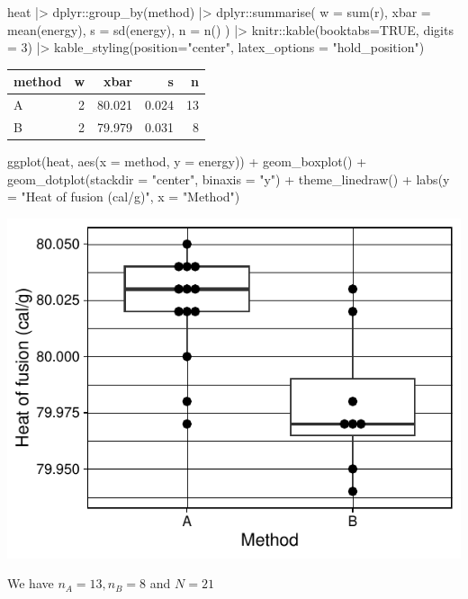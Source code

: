 \documentclass[a4paper]{article}
\begin{document}
\begin{Schunk}
\begin{Sinput}
heat |>
dplyr::group_by(method) |> 
dplyr::summarise(
  w = sum(r),
  xbar = mean(energy),
  s = sd(energy),
  n = n()
) |> 
knitr::kable(booktabs=TRUE, digits = 3) |>
 kable_styling(position="center", latex_options = "hold_position")
\end{Sinput}
\begin{table}[!h]
\centering
\begin{tabular}{lrrrr}
\toprule
method & w & xbar & s & n\\
\midrule
A & 2 & 80.021 & 0.024 & 13\\
B & 2 & 79.979 & 0.031 & 8\\
\bottomrule
\end{tabular}
\end{table}

\begin{Sinput}
ggplot(heat, aes(x = method, y = energy)) + 
  geom_boxplot() + 
  geom_dotplot(stackdir = "center", 
    binaxis = "y") +
  theme_linedraw() + 
  labs(y = "Heat of fusion (cal/g)",
       x = "Method")
\end{Sinput}


{\centering \includegraphics[width=\maxwidth]{figure/listings-unnamed-chunk-123-1} 

}

\end{Schunk}
We have \( n_A = 13, n_B = 8 \) and \( N = 21 \)
\end{document}
